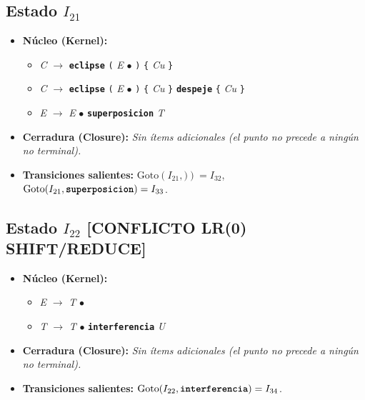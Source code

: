 \documentclass[12pt, letterpaper]{article}
\begin{document}
\subsection*{Estado $I_{21}$ }
\begin{itemize}\setlength{\itemsep}{1pt}\setlength{\parskip}{0pt}
\item \textbf{Núcleo (Kernel):}
\begin{itemize}\setlength{\itemsep}{1pt}\setlength{\parskip}{0pt}
    \item \textit{C} $\to$ \textbf{\texttt{eclipse}} \texttt{(} \textit{E} $\bullet$ \texttt{)} \texttt{\{} \textit{Cu} \texttt{\}}
    \item \textit{C} $\to$ \textbf{\texttt{eclipse}} \texttt{(} \textit{E} $\bullet$ \texttt{)} \texttt{\{} \textit{Cu} \texttt{\}} \textbf{\texttt{despeje}} \texttt{\{} \textit{Cu} \texttt{\}}
    \item \textit{E} $\to$ \textit{E} $\bullet$ \textbf{\texttt{superposicion}} \textit{T}
\end{itemize}
\item \textbf{Cerradura (Closure):} \emph{Sin ítems adicionales (el punto no precede a ningún no terminal).}
\item \textbf{Transiciones salientes:} $\text{Goto}(I_{21}, \texttt{)}) = I_{32}$, \quad $\text{Goto}(I_{21}, \textbf{\texttt{superposicion}}) = I_{33}$.
\end{itemize}
\vspace{2pt}
\subsection*{Estado $I_{22}$  \hfill {\color{accent}\textbf{[CONFLICTO LR(0) SHIFT/REDUCE]}}}
\begin{itemize}\setlength{\itemsep}{1pt}\setlength{\parskip}{0pt}
\item \textbf{Núcleo (Kernel):}
\begin{itemize}\setlength{\itemsep}{1pt}\setlength{\parskip}{0pt}
    \item \textit{E} $\to$ \textit{T} $\bullet$ 
    \item \textit{T} $\to$ \textit{T} $\bullet$ \textbf{\texttt{interferencia}} \textit{U}
\end{itemize}
\item \textbf{Cerradura (Closure):} \emph{Sin ítems adicionales (el punto no precede a ningún no terminal).}
\item \textbf{Transiciones salientes:} $\text{Goto}(I_{22}, \textbf{\texttt{interferencia}}) = I_{34}$.
\end{itemize}
\vspace{2pt}
\end{document}
